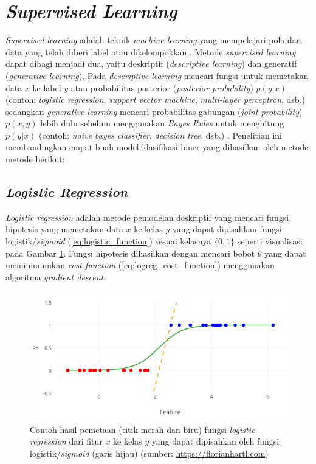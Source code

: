 \section{\textit{Supervised Learning}}

\textit{Supervised learning} adalah teknik \textit{machine learning} yang mempelajari pola dari data yang telah diberi label atau dikelompokkan \citep{mohri2012foundations}. Metode \textit{supervised learning} dapat dibagi menjadi dua, yaitu deskriptif (\textit{descriptive learning}) dan generatif (\textit{generative learning}). Pada \textit{descriptive learning} mencari fungsi untuk memetakan data $x$ ke label $y$ atau probabilitas posterior (\textit{posterior probability}) $p(y|x)$ (contoh: \textit{logistic regression}, \textit{support vector machine}, \textit{multi-layer perceptron}, dsb.) sedangkan \textit{generative learning} mencari probabilitas gabungan (\textit{joint probability}) $p(x,y)$ lebih dulu sebelum menggunakan \textit{Bayes Rules} untuk menghitung $p(y|x)$ (contoh: \textit{naive bayes classifier}, \textit{decision tree}, dsb.) \citep{ng2002discriminative}. Penelitian ini membandingkan empat buah model klasifikasi biner yang dihasilkan oleh metode-metode berikut:

\subsection{\textit{Logistic Regression}}

\textit{Logistic regression} adalah metode pemodelan deskriptif yang mencari fungsi hipotesis yang memetakan data $x$ ke kelas $y$ yang dapat dipisahkan fungsi logistik/\textit{sigmoid} (\ref{eq:logistic_function}) sesuai kelasnya $\{0,1\}$ \citep{theodoridis2015machine} seperti visualisasi pada Gambar \ref{fig:logreg}. Fungsi hipotesis dihasilkan dengan mencari bobot $\theta$ yang dapat meminimumkan \textit{cost function} (\ref{eq:logreg_cost_function}) menggunakan algoritma \textit{gradient descent}.

\begin{figure}
\centering
\includegraphics[scale=0.5]{../images/logreg.png}
\caption{Contoh hasil pemetaan (titik merah dan biru) fungsi \textit{logistic regression} dari fitur $x$ ke kelas $y$ yang dapat dipisahkan oleh fungsi logistik/\textit{sigmoid} (garis hijau) (sumber: \url{https://florianhartl.com})}
\label{fig:logreg}
\end{figure}


